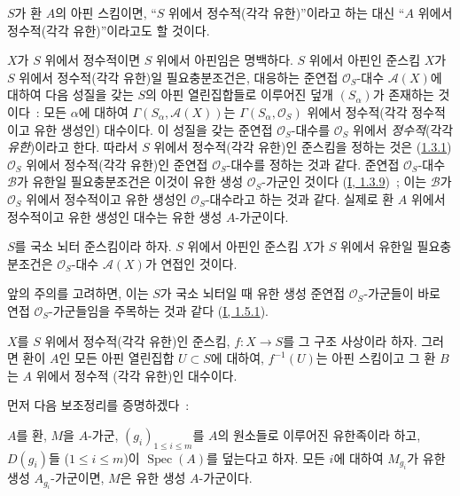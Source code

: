 $S$가 환 $A$의 아핀 스킴이면, ``$S$ 위에서 정수적(각각 유한)''이라고
하는 대신 ``$A$ 위에서 정수적(각각 유한)''이라고도 할 것이다.

\begin{env}[6.1.2]
\label{II.6.1.2-ko}
$X$가 $S$ 위에서 정수적이면 $S$ 위에서 아핀임은 명백하다. $S$ 위에서
아핀인 준스킴 $X$가 $S$ 위에서 정수적(각각 유한)일 필요충분조건은,
대응하는 준연접 $\mathcal{O}_S$-대수 $\mathcal{A}(X)$에 대하여 다음
성질을 갖는 $S$의 아핀 열린집합들로 이루어진 덮개 $(S_\alpha)$가
존재하는 것이다~: 모든 $\alpha$에 대하여
$\Gamma(S_\alpha,\mathcal{A}(X))$는
$\Gamma(S_\alpha,\mathcal{O}_S)$ 위에서 정수적(각각 정수적이고 유한
생성인) 대수이다. 이 성질을 갖는 준연접 $\mathcal{O}_S$-대수를
$\mathcal{O}_S$ 위에서 \emph{정수적}(각각 \emph{유한})이라고 한다.
따라서 $S$ 위에서 정수적(각각 유한)인 준스킴을 정하는 것은
(\hyperref[II.1.3.1-ko]{1.3.1}) $\mathcal{O}_S$ 위에서 정수적(각각
유한)인 준연접 $\mathcal{O}_S$-대수를 정하는 것과 같다. 준연접
$\mathcal{O}_S$-대수 $\mathcal{B}$가 유한일 필요충분조건은 이것이
유한 생성 $\mathcal{O}_S$-가군인 것이다
(\hyperref[I.1.3.9-ko]{I, 1.3.9})~; 이는 $\mathcal{B}$가
$\mathcal{O}_S$ 위에서 정수적이고 유한 생성인 $\mathcal{O}_S$-대수라고
하는 것과 같다. 실제로 환 $A$ 위에서 정수적이고 유한 생성인 대수는
유한 생성 $A$-가군이다.
\end{env}

\begin{proposition}[6.1.3]
\label{II.6.1.3-ko}
$S$를 국소 뇌터 준스킴이라 하자. $S$ 위에서 아핀인 준스킴 $X$가
$S$ 위에서 유한일 필요충분조건은 $\mathcal{O}_S$-대수
$\mathcal{A}(X)$가 연접인 것이다.
\end{proposition}

앞의 주의를 고려하면, 이는 $S$가 국소 뇌터일 때 유한 생성 준연접
$\mathcal{O}_S$-가군들이 바로 연접 $\mathcal{O}_S$-가군들임을 주목하는
것과 같다 (\hyperref[I.1.5.1-ko]{I, 1.5.1}).

\begin{proposition}[6.1.4]
\label{II.6.1.4-ko}
$X$를 $S$ 위에서 정수적(각각 유한)인 준스킴, $f:X\to S$를 그 구조
사상이라 하자. 그러면 환이 $A$인 모든 아핀 열린집합 $U\subset S$에
대하여, $f^{-1}(U)$는 아핀 스킴이고 그 환 $B$는 $A$ 위에서 정수적
(각각 유한)인 대수이다.
\end{proposition}


먼저 다음 보조정리를 증명하겠다~:

\begin{lemma}[6.1.4.1]
\label{II.6.1.4.1-ko}
$A$를 환, $M$을 $A$-가군, $(g_i)_{1\leq i\leq m}$를 $A$의 원소들로
이루어진 유한족이라 하고, $D(g_i)$들 ($1\leq i\leq m$)이
$\operatorname{Spec}(A)$를 덮는다고 하자. 모든 $i$에 대하여 $M_{g_i}$가
유한 생성 $A_{g_i}$-가군이면, $M$은 유한 생성 $A$-가군이다.
\end{lemma}

